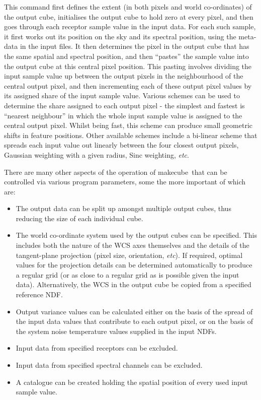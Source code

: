 \documentclass[twoside,11pt]{article}
\newcommand{\xref}[3]{#1}
\renewcommand{\_}{\texttt{\symbol{95}}}
\newcommand{\task}[1]{\textsf{#1}}
\newcommand{\makecube}{\xref{\task{makecube}}{sun258}{MAKECUBE}}
\begin{document}
This command first defines the extent (in both pixels and world
co-ordinates) of the output cube, initialises the output cube to hold
zero at every pixel, and then goes through each receptor sample value in
the input data. For each such sample, it first works out its position on
the sky and its spectral position, using the meta-data in the input
files. It then determines the pixel in the output cube that has the same
spatial and spectral position, and then ``pastes'' the sample value into
the output cube at this central pixel position. This pasting involves
dividing the input sample value up between the output pixels in the
neighbourhood of the central output pixel, and then incrementing each of
these output pixel values by its assigned share of the input sample
value. Various schemes can be used to determine the share assigned to each
output pixel - the simplest and fastest is ``nearest neighbour'' in which
the whole input sample value is assigned to the central output pixel.
Whilst being fast, this scheme can produce small geometric shifts in
feature positions. Other available schemes include a bi-linear scheme
that spreads each input value out linearly between the four closest
output pixels, Gaussian weighting with a given radius, Sinc weighting,
{\em etc}.

There are many other aspects of the operation of \makecube\ that can be
controlled via various program parameters, some the more important of
which are:

\begin{itemize}

\item The output data can be split up amongst multiple output cubes, thus
reducing the size of each individual cube.

\item The world co-ordinate system used by the output cubes can be
specified. This includes both the nature of the WCS axes themselves and
the details of the tangent-plane projection (pixel size, orientation,
{\em etc}). If required, optimal values for the projection details can be
determined automatically to produce a regular grid (or as close to a
regular grid as is possible given the input data). Alternatively, the WCS
in the output cube be copied from a specified reference NDF.

\item Output variance values can be calculated either on the basis
of the spread of the input data values that contribute to each output pixel,
or on the basis of the system noise temperature values supplied in the
input NDFs.

\item Input data from specified receptors can be excluded.

\item Input data from specified spectral channels can be excluded.

\item A catalogue can be created holding the spatial position of every
used input sample value.

\end{itemize}
\end{document}
